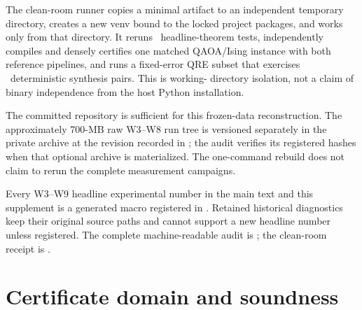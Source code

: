\documentclass[a4paper,onecolumn,10pt,unpublished]{quantumarticle}
\begin{document}
The clean-room runner copies a minimal artifact to an independent temporary
directory, creates a new venv bound to the locked project packages, and works
only from that directory.  It reruns \CleanTheoryTests\ headline-theorem
tests, independently compiles and densely certifies one matched QAOA/Ising
instance with both reference pipelines, and runs a fixed-error QRE subset that
exercises \CleanGridPairs\ deterministic synthesis pairs.  This is working-
directory isolation, not a claim of binary independence from the host Python
installation.

The committed repository is sufficient for this frozen-data reconstruction.
The approximately 700-MB raw W3--W8 run tree is versioned separately in the
private  archive at the revision recorded in
; the audit verifies its registered hashes when that
optional archive is materialized.  The one-command rebuild does not claim to
rerun the complete measurement campaigns.

Every W3--W9 headline experimental number in the main text and this supplement
is a generated macro registered in .  Retained
historical diagnostics keep their original source paths and cannot support a
new headline number unless registered.  The complete machine-readable audit is
; the clean-room receipt is
.



\section{Certificate domain and soundness}
\label{supp:certificate}











\end{document}
